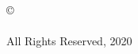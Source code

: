 
\thispagestyle{empty}
\hbox{\ }

\vfill
\renewcommand{\baselinestretch}{1}
\small\normalsize

\vspace{-.65in}

\begin{center}
\normalsize{\copyright \hbox{ }
\text{\thesisauthor}  %
\\
\hspace{1in} \\
All Rights Reserved, 2020}
\end{center}

\vfill
